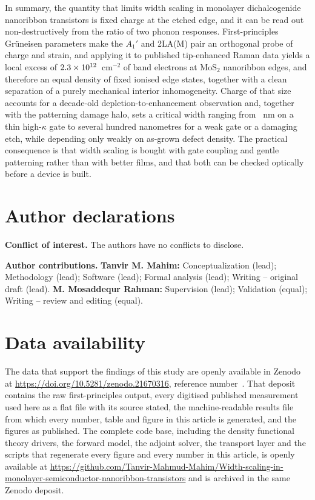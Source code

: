 \documentclass[aip,apl,amsmath,amssymb,reprint,longbibliography]{revtex4-1}
\begin{document}
In summary, the quantity that limits width scaling in monolayer dichalcogenide
nanoribbon transistors is fixed charge at the etched edge, and it can be read
out non-destructively from the ratio of two phonon responses. First-principles
Gr\"uneisen parameters make the $A_1'$ and 2LA(M) pair an orthogonal probe of
charge and strain, and applying it to published tip-enhanced Raman data yields
a local excess of $2.3\times 10^{12}$~cm$^{-2}$ of band electrons at MoS$_2$ nanoribbon
edges, and therefore an equal density of fixed ionised edge states, together
with a clean separation of a purely mechanical interior inhomogeneity. Charge of that size
accounts for a decade-old depletion-to-enhancement observation and, together
with the patterning damage halo, sets a critical width ranging from
\WcRIE~nm on a thin high-$\kappa$ gate to several hundred nanometres for a
weak gate or a damaging etch, while depending only weakly on as-grown defect
density. The practical consequence is
that width scaling is bought with gate coupling and gentle patterning rather
than with better films, and that both can be checked optically before a device
is built.


\section*{Author declarations}
\noindent\textbf{Conflict of interest.} The authors have no conflicts to
disclose.

\noindent\textbf{Author contributions.} \textbf{Tanvir M. Mahim:}
Conceptualization (lead); Methodology (lead); Software (lead); Formal analysis
(lead); Writing -- original draft (lead). \textbf{M. Mosaddequr Rahman:}
Supervision (lead); Validation (equal); Writing -- review and editing (equal).

\section*{Data availability}
The data that support the findings of this study are openly available in Zenodo
at \url{https://doi.org/10.5281/zenodo.21670316}, reference
number~. That deposit contains the raw
first-principles output, every digitised published measurement used here as a
flat file with its source stated, the machine-readable results file from which
every number, table and figure in this article is generated, and the figures as
published. The complete code base, including the density functional theory
drivers, the forward model, the adjoint solver, the transport layer and the
scripts that regenerate every figure and every number in this article, is
openly available at
\url{https://github.com/Tanvir-Mahmud-Mahim/Width-scaling-in-monolayer-semiconductor-nanoribbon-transistors}
and is archived in the same Zenodo deposit.

\nocite{aip41Control}


\end{document}
